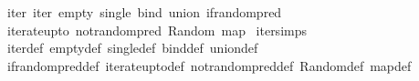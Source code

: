 \begin{isabellebody}
\isanewline
{}\isamarkupfalse%
\ {\isacharparenleft}{\kern0pt}\ iter{\isacharprime}{\kern0pt}\ iter\ empty\ single\ bind\ union\ if{\isacharunderscore}{\kern0pt}randompred\isanewline
\ \ iterate{\isacharunderscore}{\kern0pt}upto\ not{\isacharunderscore}{\kern0pt}randompred\ Random\ map\isanewline
\isanewline
{}\isamarkupfalse%
\ iter{\isacharprime}{\kern0pt}{\isachardot}{\kern0pt}simps\isanewline
\ \ \isanewline
{}\isamarkupfalse%
\ {\isacharparenleft}{\kern0pt}\ iter{\isacharunderscore}{\kern0pt}def\ empty{\isacharunderscore}{\kern0pt}def\ single{\isacharunderscore}{\kern0pt}def\ bind{\isacharunderscore}{\kern0pt}def\ union{\isacharunderscore}{\kern0pt}def\isanewline
\ \ if{\isacharunderscore}{\kern0pt}randompred{\isacharunderscore}{\kern0pt}def\ iterate{\isacharunderscore}{\kern0pt}upto{\isacharunderscore}{\kern0pt}def\ not{\isacharunderscore}{\kern0pt}randompred{\isacharunderscore}{\kern0pt}def\ Random{\isacharunderscore}{\kern0pt}def\ map{\isacharunderscore}{\kern0pt}def\ \isanewline
%
\isadelimtheory
\isanewline
%
\endisadelimtheory
%
\isatagtheory
{}\isamarkupfalse%
%
\endisatagtheory
{\isafoldtheory}%
%
\isadelimtheory
%
\endisadelimtheory
%
\end{isabellebody}%
\endinput
